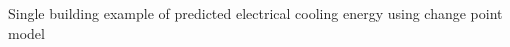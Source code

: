 Single building example of predicted electrical cooling energy using change point model
\label{fig:cooling_single}